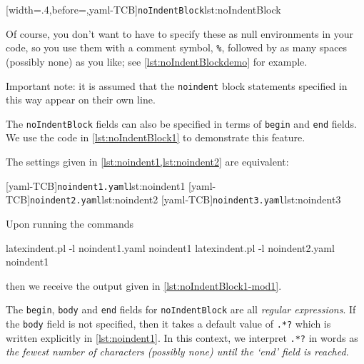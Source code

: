 	[width=.4\linewidth,before=\centering,yaml-TCB]{\texttt{noIndentBlock}}{lst:noIndentBlock}

	Of course, you don't want to have to specify these as null environments in your code, so
	you use them with a comment symbol, \lstinline!%!, followed by as many spaces (possibly
	none) as you like; see \cref{lst:noIndentBlockdemo} for example.


	Important note: it is assumed that the \texttt{noindent} block statements specified in
	this way appear on their own line.

	The  \texttt{noIndentBlock} fields
	can also be specified in terms of \texttt{begin} and \texttt{end} fields. We use the code
	in \cref{lst:noIndentBlock1} to demonstrate this feature.%


	The settings given in \cref{lst:noindent1,lst:noindent2} are equivalent:

	\begin{cmhtcbraster}[raster columns=3,
			raster left skip=-3.5cm,
			raster right skip=-2cm,
			raster column skip=.03\linewidth]
		[yaml-TCB]{\texttt{noindent1.yaml}}{lst:noindent1}
		[yaml-TCB]{\texttt{noindent2.yaml}}{lst:noindent2}
		[yaml-TCB]{\texttt{noindent3.yaml}}{lst:noindent3}
	\end{cmhtcbraster}

	Upon running the commands
	\begin{commandshell}
latexindent.pl -l noindent1.yaml noindent1
latexindent.pl -l noindent2.yaml noindent1
\end{commandshell}
	then we receive the output given in \cref{lst:noIndentBlock1-mod1}.


	The \texttt{begin}, \texttt{body} and \texttt{end} fields for \texttt{noIndentBlock} are
	all \emph{regular expressions}. If the \texttt{body} field is not specified, then it
	takes a default value of \lstinline!.*?! which is written explicitly in
	\cref{lst:noindent1}. In this context, we interpret \lstinline!.*?! in words as \emph{the
	fewest number of characters (possibly none) until the `end' field is reached}.

